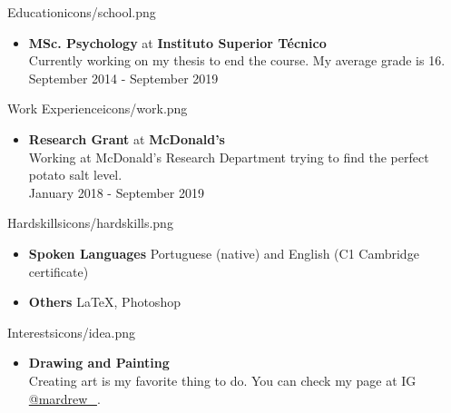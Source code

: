\documentclass{thepurplecv}
\begin{document}
\begin{purplesectionleft}{Education}{icons/school.png}
{
\begin{itemize}[leftmargin=0cm,align=left]
    \item[] \textbf{MSc. Psychology} at \textbf{Instituto Superior Técnico}\\
    Currently working on my thesis to end the course. My average grade is 16. \\
    September 2014 - September 2019
\end{itemize}
}
\end{purplesectionleft}

\begin{purplesectionright}{Work Experience}{icons/work.png}
{
\begin{itemize}[leftmargin=0cm,align=left]
    \item[] \textbf{Research Grant} at \textbf{McDonald's}\\
    Working at McDonald's Research Department trying to find the perfect potato salt level.\\
    January 2018 - September 2019
\end{itemize}
}
\end{purplesectionright}

\begin{purplesectionleft}{Hardskills}{icons/hardskills.png}
{
\begin{itemize}[leftmargin=0cm,align=left]
    \item[] \textbf{Spoken Languages}
    Portuguese (native) and English (C1 Cambridge certificate)
    \\
    \item[] \textbf{Others}
    \LaTeX, Photoshop
\end{itemize}
}
\end{purplesectionleft}

\begin{purplesectionright}{Interests}{icons/idea.png}
{
\begin{itemize}[leftmargin=0cm,align=left]
    \item[] \textbf{Drawing and Painting}\\
    Creating art is my favorite thing to do. You can check my page at IG  \href{https://www.instagram.com/mardrew_/}{@mardrew\_}.\\
\end{itemize}
}
\end{purplesectionright}
\end{document}

